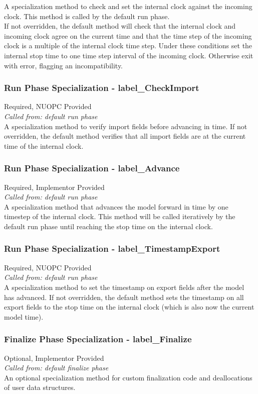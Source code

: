 A specialization method to check and set the internal clock against the incoming clock. This method is called by the default run phase.\\

If not overridden, the default method will check that the internal clock and incoming clock agree on the current time and that the time step of the incoming clock is a multiple of the internal clock time step. Under these conditions set the internal stop time to one time step interval of the incoming clock. Otherwise exit with error, flagging an incompatibility.

\subsubsection{Run Phase Specialization - label\_CheckImport}
{\sc Required, NUOPC Provided}\\
{\em Called from: default run phase}\\

A specialization method to verify import fields before advancing in time. If not overridden, the default method verifies that all import fields are at the current time of the internal clock.

\subsubsection{Run Phase Specialization - label\_Advance}
{\sc Required, Implementor Provided}\\
{\em Called from: default run phase}\\

A specialization method that advances the model forward in time by one timestep of the internal clock. This method will be called iteratively by the default run phase until reaching the stop time on the internal clock.

\subsubsection{Run Phase Specialization - label\_TimestampExport}
{\sc Required, NUOPC Provided}\\
{\em Called from: default run phase}\\

A specialization method to set the timestamp on export fields after the model has advanced. If not overridden, the default method sets the timestamp on all export fields to the stop time on the internal clock (which is also now the current model time).

\subsubsection{Finalize Phase Specialization - label\_Finalize}
{\sc Optional, Implementor Provided}\\
{\em Called from: default finalize phase}\\

An optional specialization method for custom finalization code and deallocations of user data structures.

\mbox{}\hrulefill\ 

